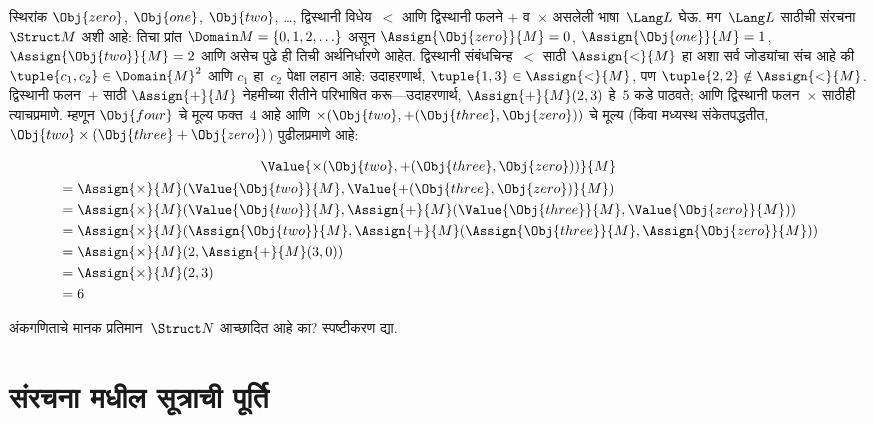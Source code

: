 \begin{ex}
स्थिरांक $\Obj{zero}$, $\Obj{one}$, $\Obj{two}$, \dots, द्विस्थानी
विधेय~$<$ आणि द्विस्थानी फलने $+$ व~$\times$ असलेली
भाषा~$\Lang L$ घेऊ. मग~$\Lang L$ साठीची संरचना~$\Struct M$ अशी
आहे: तिचा प्रांत $\Domain M = \{0, 1, 2, \ldots \}$ असून
$\Assign{\Obj{zero}}{M} = 0$, $\Assign{\Obj{one}}{M} = 1$,
$\Assign{\Obj{two}}{M} = 2$ आणि असेच पुढे ही तिची अर्थनिर्धारणे आहेत.
द्विस्थानी संबंधचिन्ह~$<$ साठी $\Assign{<}{M}$ हा अशा सर्व जोड्यांचा
संच आहे की $\tuple{c_1, c_2} \in \Domain{M}^2$ आणि $c_1$ हा~$c_2$ पेक्षा
लहान आहे: उदाहरणार्थ, $\tuple{1, 3} \in \Assign{<}{M}$, पण
$\tuple{2, 2} \notin \Assign{<}{M}$. द्विस्थानी फलन~$+$ साठी
$\Assign{+}{M}$ नेहमीच्या रीतीने परिभाषित करू---उदाहरणार्थ,
$\Assign{+}{M}(2,3)$ हे~$5$ कडे पाठवते; आणि द्विस्थानी
फलन~$\times$ साठीही त्याचप्रमाणे. म्हणून $\Obj{four}$ चे
मूल्य फक्त~$4$ आहे आणि $\times(\Obj{two},
+(\Obj{three},\Obj{zero}))$ चे मूल्य (किंवा मध्यस्थ संकेतपद्धतीत,
$\Obj{two} \times (\Obj{three} + \Obj{zero})$) पुढीलप्रमाणे आहे:

\begin{multline*}
\Value{\times(\Obj{two}, +(\Obj{three},\Obj{zero}))}{M} \\
\begin{aligned}
& =\Assign{\times}{M}(\Value{\Obj{two}}{M}, \Value{+(\Obj{three}, \Obj{zero})}{M})\\
& = \Assign{\times}{M}(\Value{\Obj{two}}{M}, \Assign{+}{M}(\Value{\Obj{three}}{M},
\Value{\Obj{zero}}{M})) \\
& = \Assign{\times}{M}(\Assign{\Obj{two}}{M}, \Assign{+}{M}(\Assign{\Obj{three}}{M},
\Assign{\Obj{zero}}{M})) \\
& = \Assign{\times}{M}(2, \Assign{+}{M}(3, 0)) \\
& = \Assign{\times}{M}(2, 3) \\
& = 6
\end{aligned}
\end{multline*}
\end{ex}

\begin{prob}
अंकगणिताचे मानक प्रतिमान~$\Struct N$ आच्छादित आहे का? स्पष्टीकरण द्या.
\end{prob}












\section{संरचना मधील
  सूत्राची पूर्ति}\label{fol:syn:sat:sec}

